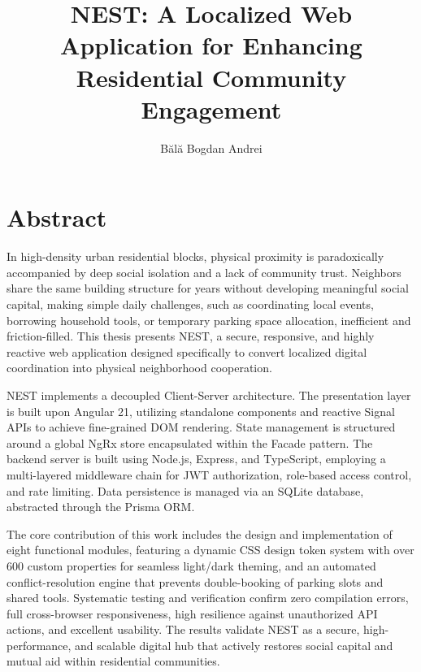 \documentclass[12pt]{report}
\begin{document}
\title{NEST: A Localized Web Application for Enhancing Residential Community Engagement}					   
\author{Bălă Bogdan Andrei}											
				
\maketitle


\newpage
\thispagestyle{empty}
 \mbox{}
\newpage
{} 

\cleardoublepage
\section*{Abstract}

In high-density urban residential blocks, physical proximity is paradoxically accompanied by deep social isolation and a lack of community trust. Neighbors share the same building structure for years without developing meaningful social capital, making simple daily challenges, such as coordinating local events, borrowing household tools, or temporary parking space allocation, inefficient and friction-filled. This thesis presents NEST, a secure, responsive, and highly reactive web application designed specifically to convert localized digital coordination into physical neighborhood cooperation. 

NEST implements a decoupled Client-Server architecture. The presentation layer is built upon Angular 21, utilizing standalone components and reactive Signal APIs to achieve fine-grained DOM rendering. State management is structured around a global NgRx store encapsulated within the Facade pattern. The backend server is built using Node.js, Express, and TypeScript, employing a multi-layered middleware chain for JWT authorization, role-based access control, and rate limiting. Data persistence is managed via an SQLite database, abstracted through the Prisma ORM.

The core contribution of this work includes the design and implementation of eight functional modules, featuring a dynamic CSS design token system with over 600 custom properties for seamless light/dark theming, and an automated conflict-resolution engine that prevents double-booking of parking slots and shared tools. Systematic testing and verification confirm zero compilation errors, full cross-browser responsiveness, high resilience against unauthorized API actions, and excellent usability. The results validate NEST as a secure, high-performance, and scalable digital hub that actively restores social capital and mutual aid within residential communities.
\end{document}
